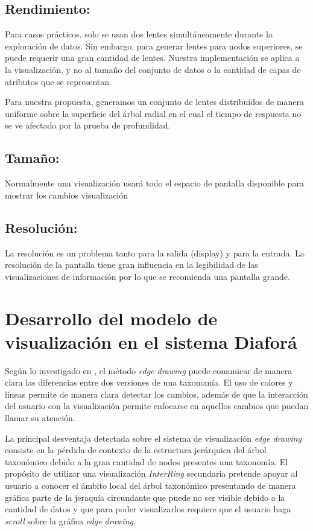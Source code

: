 \documentclass[journal]{IEEEtran}
\begin{document}
\subsection{Rendimiento: }
Para casos prácticos, solo se usan dos lentes simultáneamente durante la exploración de datos. Sin embargo, para generar lentes para nodos superiores, se puede requerir una gran cantidad de lentes. Nuestra implementación se aplica a la visualización, y no al tamaño del conjunto de datos o la cantidad de capas de atributos que se representan.

Para nuestra propuesta, generamos un conjunto  de lentes distribuidos de manera uniforme sobre la superficie del árbol radial en el cual el tiempo de respuesta no se ve afectado por la prueba de profundidad. 

\subsection{Tamaño: } Normalmente una visualización usará todo el espacio de pantalla disponible para mostrar los cambios visualización

\subsection{Resolución: } La resolución es un problema tanto para la salida (display) y para la entrada. La resolución de la pantalla tiene gran influencia en la legibilidad de las visualizaciones de información por lo que se recomienda una pantalla grande. 

\section{Desarrollo del modelo de visualización en el sistema Diaforá}
Según lo investigado en \cite{sancho_diafora}, el método \emph{edge drawing} puede comunicar de manera clara las
diferencias entre dos versiones de una taxonomía. El uso de colores y líneas permite de manera clara detectar los
cambios, además de que la interacción del usuario con la visualización permite enfocarse en aquellos cambios que 
puedan llamar su atención.

La principal desventaja detectada sobre el sistema de visualización \emph{edge drawing} consiste en la pérdida de contexto
de la estructura jerárquica del árbol taxonómico debido a la gran cantidad de nodos presentes una taxonomía.
El propósito de utilizar una visualización \emph{InterRing}\cite{yang_ward_rundensteiner} secundaria pretende apoyar al usuario a conocer
el ámbito local del árbol taxonómico presentando de manera gráfica parte de la jeraquía circundante que puede no ser visible debido a la cantidad de datos
y que para poder visualizarlos requiere que el usuario haga \emph{scroll} sobre la gráfica \emph{edge drawing}.
\end{document}
